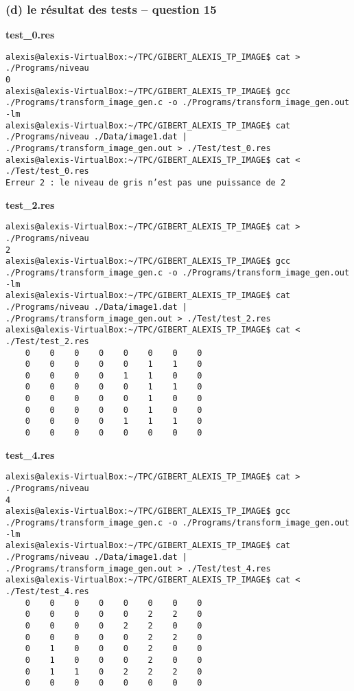 \documentclass[11pt]{article}
\begin{document}
\subsubsection{(d) le résultat des tests -- question
15}\label{d-le-ruxe9sultat-des-tests-question-15}

\textbf{test\_0.res}

\begin{verbatim}
alexis@alexis-VirtualBox:~/TPC/GIBERT_ALEXIS_TP_IMAGE$ cat > ./Programs/niveau
0
alexis@alexis-VirtualBox:~/TPC/GIBERT_ALEXIS_TP_IMAGE$ gcc ./Programs/transform_image_gen.c -o ./Programs/transform_image_gen.out -lm
alexis@alexis-VirtualBox:~/TPC/GIBERT_ALEXIS_TP_IMAGE$ cat ./Programs/niveau ./Data/image1.dat | ./Programs/transform_image_gen.out > ./Test/test_0.res
alexis@alexis-VirtualBox:~/TPC/GIBERT_ALEXIS_TP_IMAGE$ cat < ./Test/test_0.res 
Erreur 2 : le niveau de gris n’est pas une puissance de 2
\end{verbatim}

\textbf{test\_2.res}

\begin{verbatim}
alexis@alexis-VirtualBox:~/TPC/GIBERT_ALEXIS_TP_IMAGE$ cat > ./Programs/niveau
2
alexis@alexis-VirtualBox:~/TPC/GIBERT_ALEXIS_TP_IMAGE$ gcc ./Programs/transform_image_gen.c -o ./Programs/transform_image_gen.out -lm
alexis@alexis-VirtualBox:~/TPC/GIBERT_ALEXIS_TP_IMAGE$ cat ./Programs/niveau ./Data/image1.dat | ./Programs/transform_image_gen.out > ./Test/test_2.res
alexis@alexis-VirtualBox:~/TPC/GIBERT_ALEXIS_TP_IMAGE$ cat < ./Test/test_2.res 
    0    0    0    0    0    0    0    0
    0    0    0    0    0    1    1    0
    0    0    0    0    1    1    0    0
    0    0    0    0    0    1    1    0
    0    0    0    0    0    1    0    0
    0    0    0    0    0    1    0    0
    0    0    0    0    1    1    1    0
    0    0    0    0    0    0    0    0
\end{verbatim}

\textbf{test\_4.res}

\begin{verbatim}
alexis@alexis-VirtualBox:~/TPC/GIBERT_ALEXIS_TP_IMAGE$ cat > ./Programs/niveau
4
alexis@alexis-VirtualBox:~/TPC/GIBERT_ALEXIS_TP_IMAGE$ gcc ./Programs/transform_image_gen.c -o ./Programs/transform_image_gen.out -lm
alexis@alexis-VirtualBox:~/TPC/GIBERT_ALEXIS_TP_IMAGE$ cat ./Programs/niveau ./Data/image1.dat | ./Programs/transform_image_gen.out > ./Test/test_4.res
alexis@alexis-VirtualBox:~/TPC/GIBERT_ALEXIS_TP_IMAGE$ cat < ./Test/test_4.res 
    0    0    0    0    0    0    0    0
    0    0    0    0    0    2    2    0
    0    0    0    0    2    2    0    0
    0    0    0    0    0    2    2    0
    0    1    0    0    0    2    0    0
    0    1    0    0    0    2    0    0
    0    1    1    0    2    2    2    0
    0    0    0    0    0    0    0    0
\end{verbatim}
\end{document}
